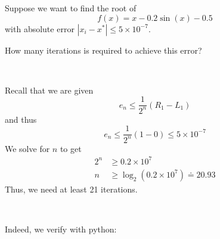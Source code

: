 \begin{example}
    Suppose we want to find the root of \[
        f(x) = x - 0.2 \sin(x) - 0.5
    \] with absolute error \( | x_i - x^\ast | \leq 5 \times 10^{-7} \).

    How many iterations is required to achieve this error?

    {~~~}

    Recall that we are given \[
        e_n \leq \frac{1}{2^n} ( R_1 - L_1 )
    \] and thus \[
        e_n \leq \frac{1}{2^n} (1 - 0) \leq 5 \times 10^{-7}
    \] We solve for \( n \) to get \begin{align*}
        2^n
         & \geq 0.2 \times 10^7
        \\
        n
         & \geq \log_2 \left( 0.2 \times 10^7 \right) \doteq 20.93
    \end{align*}
    Thus, we need at least 21 iterations.

        {~~~}

    Indeed, we verify with python:


\end{example}
